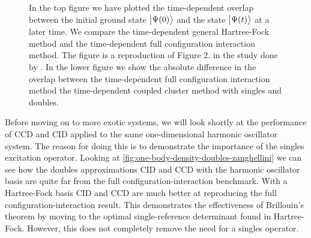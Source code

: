 \begin{figure}
            \caption{In the top figure we have plotted the time-dependent
            overlap between the initial ground state $\ket{\Psi(0)}$ and the
            state $\ket{\Psi(t)}$ at a later time.
            We compare the time-dependent general Hartree-Fock method and
            the time-dependent full configuration interaction method.
            The figure is a reproduction of Figure 2. in the study done by
            \citeauthor{zanghellini_2004} \cite{zanghellini_2004}.
            In the lower figure we show the absolute difference in the
            overlap between the time-dependent full configuration
            interaction method the time-dependent coupled cluster method
            with singles and doubles.}
            \label{fig:overlap-zanghellini}
        \end{figure}

        Before moving on to more exotic systems, we will look shortly at the
        performance of CCD and CID applied to the same one-dimensional harmonic
        oscillator system.
        The reason for doing this is to demonstrate the importance of the
        singles excitation operator.
        Looking at \autoref{fig:one-body-density-doubles-zanghellini} we can see
        how the doubles approximations CID and CCD with the harmonic oscillator
        basis are quite far from the full configuration-interaction benchmark.
        With a Hartree-Fock basis CID and CCD are much better at reproducing the
        full configuration-interaction result.
        This demonstrates the effectiveness of Brillouin's theorem by moving to
        the optimal single-reference determinant found in Hartree-Fock.
        However, this does not completely remove the need for a singles
        operator.

